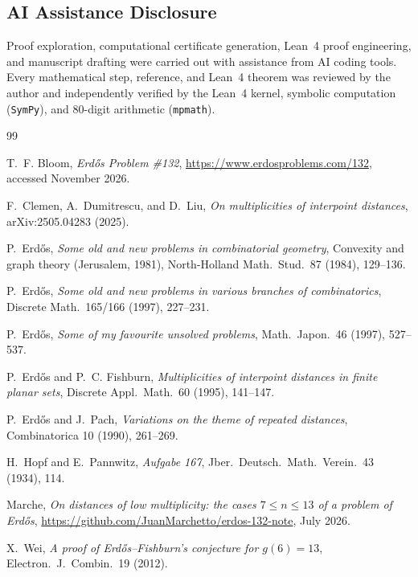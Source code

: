 \documentclass[11pt,reqno]{amsart}
\theoremstyle{definition}
\begin{document}
\subsection*{AI Assistance Disclosure}
Proof exploration, computational certificate generation, Lean~4 proof engineering, and manuscript drafting were carried out with assistance from AI coding tools. Every mathematical step, reference, and Lean~4 theorem was reviewed by the author and independently verified by the Lean~4 kernel, symbolic computation (\texttt{SymPy}), and $80$-digit arithmetic (\texttt{mpmath}).

\begin{thebibliography}{99}

T.~F. Bloom, \emph{Erd\H{o}s Problem \#132}, \url{https://www.erdosproblems.com/132}, accessed November 2026.

F.~Clemen, A.~Dumitrescu, and D.~Liu, \emph{On multiplicities of interpoint distances}, arXiv:2505.04283 (2025).

P.~Erd\H{o}s, \emph{Some old and new problems in combinatorial geometry}, Convexity and graph theory (Jerusalem, 1981), North-Holland Math.\ Stud.\ 87 (1984), 129--136.

P.~Erd\H{o}s, \emph{Some old and new problems in various branches of combinatorics}, Discrete Math.\ 165/166 (1997), 227--231.

P.~Erd\H{o}s, \emph{Some of my favourite unsolved problems}, Math.\ Japon.\ 46 (1997), 527--537.

P.~Erd\H{o}s and P.~C. Fishburn, \emph{Multiplicities of interpoint distances in finite planar sets}, Discrete Appl.\ Math.\ 60 (1995), 141--147.

P.~Erd\H{o}s and J.~Pach, \emph{Variations on the theme of repeated distances}, Combinatorica 10 (1990), 261--269.

H.~Hopf and E.~Pannwitz, \emph{Aufgabe 167}, Jber.\ Deutsch.\ Math.\ Verein.\ 43 (1934), 114.

Marche, \emph{On distances of low multiplicity: the cases $7 \le n \le 13$ of a problem of Erd\H{o}s}, \url{https://github.com/JuanMarchetto/erdos-132-note}, July 2026.

X.~Wei, \emph{A proof of Erd\H{o}s--Fishburn's conjecture for $g(6)=13$}, Electron.\ J.\ Combin.\ 19 (2012).

\end{thebibliography}
\end{document}
